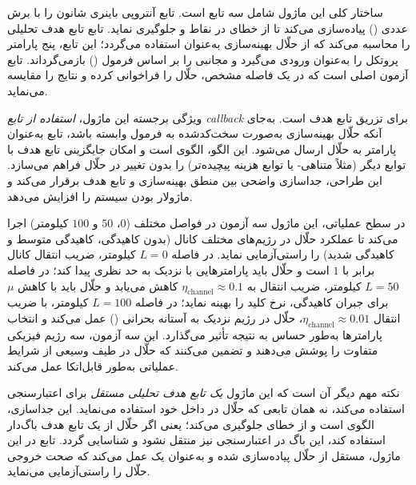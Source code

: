 ساختار کلی این ماژول شامل سه تابع است. تابع  آنتروپی باینری شانون را با برش عددی () پیاده‌سازی می‌کند تا از خطای  در نقاط  و  جلوگیری نماید. تابع  تابع هدف تحلیلی را محاسبه می‌کند که از حلّال بهینه‌سازی به‌عنوان  استفاده می‌گردد؛ این تابع، پنج پارامتر پروتکل را به‌عنوان ورودی می‌گیرد و  مجانبی را بر اساس فرمول  () بازمی‌گرداند. تابع  آزمون اصلی است که در یک فاصله مشخص، حلّال را فراخوانی کرده و نتایج را مقایسه می‌نماید.

ویژگی برجسته این ماژول، \emph{استفاده از تابع callback} برای تزریق تابع هدف است. به‌جای آنکه حلّال بهینه‌سازی به‌صورت سخت‌کدشده به فرمول  وابسته باشد، تابع  به‌عنوان پارامتر به حلّال ارسال می‌شود. این الگو، الگوی  است و امکان جایگزینی تابع هدف با توابع دیگر (مثلاً  متناهی- یا توابع هزینه پیچیده‌تر) را بدون تغییر در حلّال فراهم می‌سازد. این طراحی، جداسازی واضحی بین منطق بهینه‌سازی و تابع هدف برقرار می‌کند و ماژولار بودن سیستم را افزایش می‌دهد.

در سطح عملیاتی، این ماژول سه آزمون در فواصل مختلف ($0$، $50$ و $100$ کیلومتر) اجرا می‌کند تا عملکرد حلّال در رژیم‌های مختلف کانال (بدون کاهیدگی، کاهیدگی متوسط و کاهیدگی شدید) را راستی‌آزمایی نماید. در فاصله $L = 0$ کیلومتر، ضریب انتقال کانال برابر با $1$ است و حلّال باید پارامترهایی با  نزدیک به حد نظری پیدا کند؛ در فاصله $L = 50$ کیلومتر، ضریب انتقال به $\eta_{\text{channel}} \approx 0.1$ کاهش می‌یابد و حلّال باید با کاهش $\mu$ برای جبران کاهیدگی، نرخ کلید را بهینه نماید؛ در فاصله $L = 100$ کیلومتر، با ضریب انتقال $\eta_{\text{channel}} \approx 0.01$، حلّال در رژیم نزدیک به آستانه بحرانی  () عمل می‌کند و انتخاب پارامترها به‌طور حساس به نتیجه تأثیر می‌گذارد. این سه آزمون، سه رژیم فیزیکی متفاوت را پوشش می‌دهند و تضمین می‌کنند که حلّال در طیف وسیعی از شرایط عملیاتی به‌طور قابل‌اتکا عمل می‌کند.

نکته مهم دیگر آن است که این ماژول \emph{یک تابع هدف تحلیلی مستقل} برای اعتبارسنجی استفاده می‌کند، نه همان تابعی که حلّال در داخل خود استفاده می‌نماید. این جداسازی، الگوی  است و از خطای  جلوگیری می‌کند؛ یعنی اگر حلّال از یک تابع هدف باگ‌دار استفاده کند، این باگ در اعتبارسنجی نیز منتقل نشود و شناسایی گردد. تابع  در این ماژول، مستقل از حلّال پیاده‌سازی شده و به‌عنوان یک  عمل می‌کند که صحت خروجی حلّال را راستی‌آزمایی می‌نماید.

